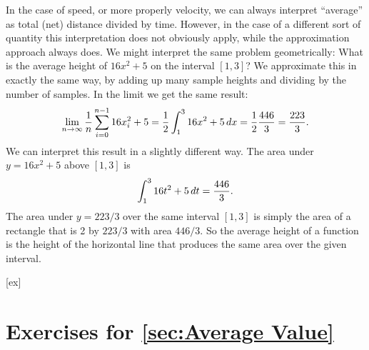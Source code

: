 In the case of speed, or more properly velocity, we can always
interpret ``average'' as total (net) distance divided by time. However, in
the case of a different sort of quantity this interpretation does not
obviously apply, while the approximation approach always does. We might
interpret the same problem geometrically: What is the average height
of $16x^2+5$ on the interval $[1,3]$? We approximate this in exactly
the same way, by adding up many sample heights and dividing by the
number of samples. In the limit we get the same result:
$$
  \lim_{n\to\infty}{1\over n}\sum_{i=0}^{n-1} 16x_i^2+5=
  {1\over 2}\int_1^3 16x^2+5\,dx={1\over 2}{446\over 3}={223\over 3}.
$$
We can interpret this result in a slightly different way. The area
under $y=16x^2+5$ above $[1,3]$ is
$$\int_1^3 16t^2+5\,dt={446\over 3}.$$ 
The area under $y=223/3$ over the same interval $[1,3]$ is simply the
area of a rectangle that is 2 by $223/3$ with area $446/3$. So the
average height of a function is the height of the horizontal line that
produces the same area over the given interval.


[ex]
\section*{Exercises for \ref{sec:Average Value}}

